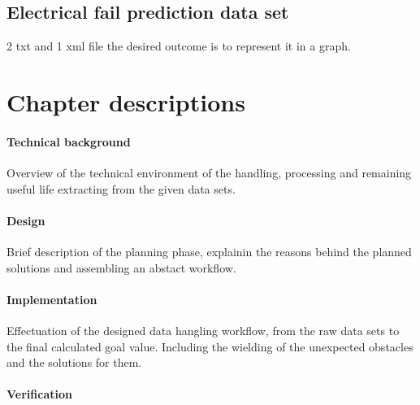   \subsection{Electrical fail prediction data set}
2 txt and 1 xml file the desired outcome is to represent it in a graph.

\section{Chapter descriptions}
		\paragraph{Technical background}

Overview of the technical environment of the handling, processing and remaining useful life extracting from the given data sets.

		\paragraph{Design}

Brief description of the planning phase, explainin the reasons behind the planned solutions and assembling an abstact workflow.

		\paragraph{Implementation}

Effectuation of the designed data hangling workflow, from the raw data sets to the final calculated goal value. Including the wielding of the unexpected obstacles and the solutions for them.

		\paragraph{Verification}

